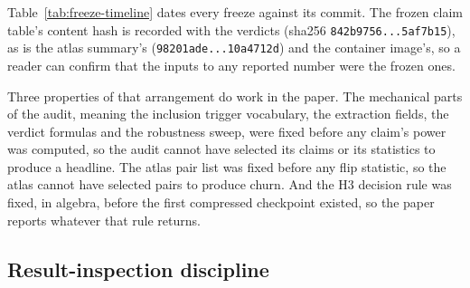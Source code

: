 Table~\ref{tab:freeze-timeline} dates every freeze against its commit. The
frozen claim table's content hash is recorded with the verdicts (sha256
\texttt{842b9756...5af7b15}), as is the atlas summary's
(\texttt{98201ade...10a4712d}) and the container image's, so a reader can
confirm that the inputs to any reported number were the frozen ones.

Three properties of that arrangement do work in the paper. The mechanical parts
of the audit, meaning the inclusion trigger vocabulary, the extraction fields,
the verdict formulas and the robustness sweep, were fixed before any claim's
power was computed, so the audit cannot have selected its claims or its
statistics to produce a headline. The atlas pair list was fixed before any flip
statistic, so the atlas cannot have selected pairs to produce churn. And the H3
decision rule was fixed, in algebra, before the first compressed checkpoint
existed, so the paper reports whatever that rule returns.

\subsection{Result-inspection discipline}
\label{app:prereg:discipline}

